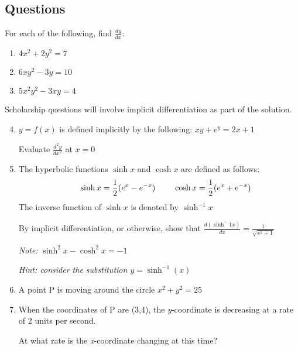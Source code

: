 \documentclass[../main.tex]{subfiles}
\begin{document}
\subsection*{Questions}
\label{Implicit Differentiation}
For each of the following, find \(\frac{dy}{dx}\):
\begin{enumerate}
    \item \(4x^2 +2y^2 = 7\) 
    
    \item \(6xy^2 - 3y=10\) 
    
    \item \(5x^2y^2 -3xy=4\) 
    
\end{enumerate}
Scholarship questions will involve implicit differentiation as part of the solution.
\begin{enumerate}
    \setcounter{enumi}{3}
    \item \(y=f(x)\) is defined implicitly by the following: \(xy+e^y=2x+1\)
    
    Evaluate \( \frac{d^2y}{dx^2}\) at \(x=0\)

    \item The hyperbolic functions \(\sinh{x}\) and \(\cosh{x}\) are defined as follows:
    \begin{align*}
        &\hspace{0.5cm} \sinh{x}=\frac{1}{2}(e^x-e^{-x}) 
        &\hspace{0.5cm} \cosh{x}=\frac{1}{2}(e^x+e^{-x}) 
    \end{align*}    
    The inverse function of \(\sinh{x}\) is denoted by \(\sinh^{-1}{x}\)

    By implicit differentiation, or otherwise, show that \( \frac{d(\sinh^-1x)}{dx}=\frac{1}{\sqrt{x^2+1}}\)

    \textit{Note:} \(\sinh^2{x}-\cosh^2{x}=-1\)

    \textit{Hint: consider the substitution \(y=\sinh^{-1}(x)\)}

    \item A point P is moving around the circle \(x^2+y^2=25\)
    \item 
    When the coordinates of P are (3,4), the \textit{y}-coordinate is decreasing at a rate of 2 units per second.

    At what rate is the \textit{x}-coordinate changing at this time?
\end{enumerate}

\pagebreak
\end{document}
